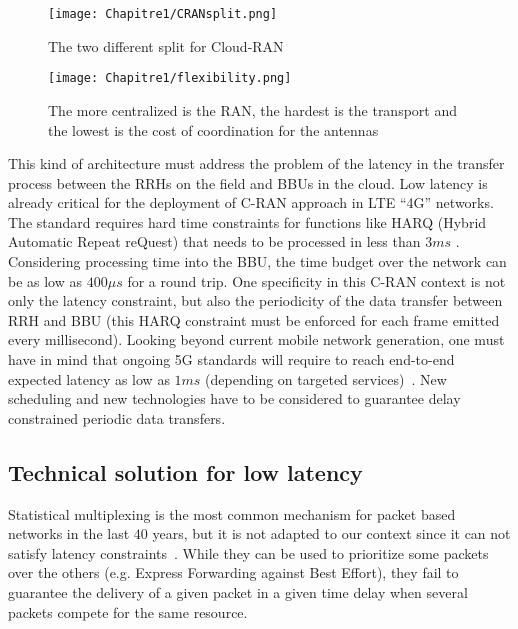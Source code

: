   \begin{figure}[h]
      \begin{center}
      \texttt{[image: Chapitre1/CRANsplit.png]}
      \end{center}
      \caption{The two different split for Cloud-RAN}\label{fig:CRANsplit}
      \end{figure}
      \begin{figure}[h]
      \begin{center}
      \texttt{[image: Chapitre1/flexibility.png]}
      \end{center}
      \caption{The more centralized is the RAN, the hardest is the transport and the lowest is the cost of coordination for the antennas}\label{fig:flexibility}
      \end{figure}
       
This kind of architecture must address the problem of the latency in the transfer process between the RRHs on the field and BBUs in the cloud. Low latency is already critical for the deployment of C-RAN approach in LTE “4G” networks. The standard requires hard time constraints for functions like HARQ (Hybrid Automatic Repeat reQuest) that needs to be processed in less than $3ms$ \cite{bouguen2012lte}. Considering processing time into the BBU, the time budget over the network can be as low as $400\mu s$ for a round trip. One specificity in this C-RAN context is not only the latency constraint, but also the periodicity of the data transfer between RRH and BBU (this HARQ constraint must be enforced for each frame emitted every millisecond). Looking beyond current mobile network generation, one must have in mind that ongoing 5G standards will require to reach end-to-end expected latency as low as $1ms$ (depending on targeted services)~\cite{boccardi2014five}. New scheduling and new technologies have to be considered to guarantee delay constrained periodic data transfers. 


\subsection{Technical solution for low latency}
Statistical multiplexing is the most common mechanism for packet based networks in the last $40$ years, but it is not adapted to our context since it can not satisfy latency constraints~\cite{khaunte2003technique}. While they can be used to prioritize some packets over the others (e.g. Express Forwarding against Best Effort), they fail to guarantee the delivery of a given packet in a given time delay when several packets compete for the same resource. 

